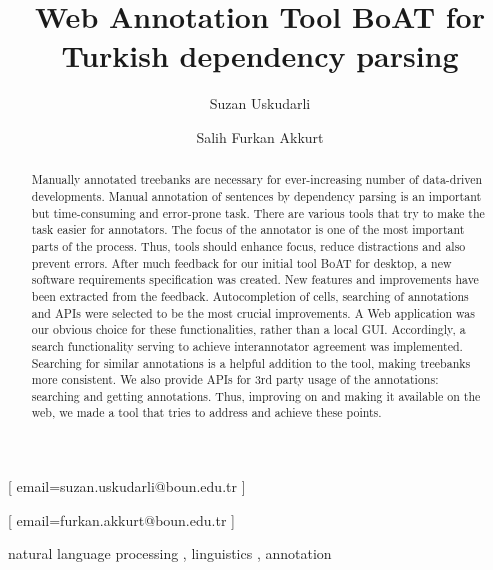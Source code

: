 \documentclass[
]{ceurart}
\begin{document}


\title{Web Annotation Tool BoAT for Turkish dependency parsing}

\author[1]{Suzan Uskudarli}[%
email=suzan.uskudarli@boun.edu.tr
]

\author[1]{Salih Furkan Akkurt}[%
email=furkan.akkurt@boun.edu.tr
]

\address[1]{ Department of Computer Engineering, Bogazici University, Bebek, 34342, İstanbul, Turkey }

\begin{abstract}
Manually annotated treebanks are necessary for ever-increasing number of data-driven developments.
Manual annotation of sentences by dependency parsing is an important but time-consuming and error-prone task.
There are various tools that try to make the task easier for annotators.
The focus of the annotator is one of the most important parts of the process.
Thus, tools should enhance focus, reduce distractions and also prevent errors.
After much feedback for our initial tool BoAT for desktop, a new software requirements specification was created.
New features and improvements have been extracted from the feedback.
Autocompletion of cells, searching of annotations and APIs were selected to be the most crucial improvements.
A Web application was our obvious choice for these functionalities, rather than a local GUI.
Accordingly, a search functionality serving to achieve interannotator agreement was implemented.
Searching for similar annotations is a helpful addition to the tool, making treebanks more consistent.
We also provide APIs for 3rd party usage of the annotations: searching and getting annotations.
Thus, improving on and making it available on the web, we made a tool that tries to address and achieve these points.
\end{abstract}

\begin{keywords}
natural language processing \sep
linguistics \sep
annotation
\end{keywords}

\maketitle
\end{document}
